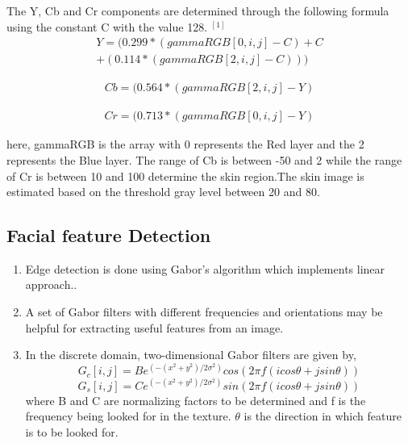 \documentclass[journal]{IEEEtran}
\begin{document}
	The Y, Cb and Cr components are determined through
	the following formula using the constant C with the value
	128. $^{[1]}$
	\begin{equation}
	\begin{split}
	Y=(0.299*(gammaRGB[0,i,j]-C)+C\\
	+(0.114*(gammaRGB[2,i,j]-C)))
	\end{split}
	\end{equation}
	
	\begin{equation}
	\begin{split}
	Cb=(0.564*(gammaRGB[2,i,j]-Y)
	\end{split}
	\end{equation}
	
	
	\begin{equation}
	\begin{split}
	Cr=(0.713*(gammaRGB[0,i,j]-Y)
	\end{split}
	\end{equation}
	
	here, gammaRGB is the array with 0 represents the Red
	layer and the 2 represents the Blue layer. The range of Cb
	is between -50 and 2 while the range of Cr is between 10
	and 100 determine the skin region.The skin image is estimated based on the threshold
	gray level between 20 and 80.
	
	\subsection{\textbf{Facial feature Detection}}
	\begin{enumerate}
		\item Edge detection is done using Gabor's algorithm which implements linear approach..
		\item A set of Gabor filters with different frequencies and orientations may be helpful for extracting useful features from an image.
		\item In the discrete domain, two-dimensional Gabor filters are given by,\\
		\begin{equation}
		G_c[i, j] = Be^{(-(x^2+y^2)/2\sigma^2)}cos(2\pi f(icos\theta + jsin\theta))
		\end{equation}
		\begin{equation}
		G_s[i, j] = Ce^{(-(x^2+y^2)/2\sigma^2)}sin(2\pi f(icos\theta + jsin\theta))
		\end{equation}
		where B and C are normalizing factors to be determined and f is the frequency being looked for in the texture. $\theta$ is the direction in which feature is to be looked for.
	\end{enumerate}
	
\end{document}
